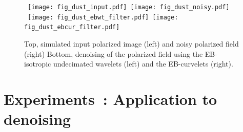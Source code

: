 \begin{figure*}[htb]
\centerline{
\vbox{
 \hbox{
 \texttt{[image: fig\_dust\_input.pdf]}
  \texttt{[image: fig\_dust\_noisy.pdf]}
 }
 \hbox{
 \texttt{[image: fig\_dust\_ebwt\_filter.pdf]}
  \texttt{[image: fig\_dust\_ebcur\_filter.pdf]}
 }}}
\caption{Top, simulated input polarized image (left) and noisy polarized field (right) Bottom, denoising of the polarized field using the EB-isotropic undecimated wavelets (left) and the EB-curvelets (right).}
\label{fig_poldust_denoising}
\end{figure*}




%


\section{Experiments~: Application to denoising}
\label{sec:pol_denoising}

